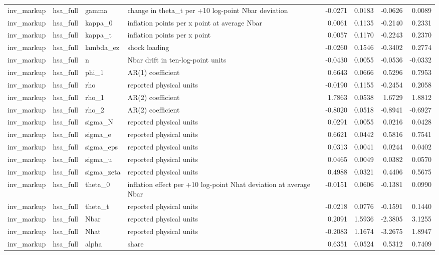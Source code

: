 \begin{tabular}{llllrrrr}
inv\_markup & hsa\_full & gamma & change in theta\_t per +10 log-point Nbar deviation & -0.0271 & 0.0183 & -0.0626 & 0.0089 \\
inv\_markup & hsa\_full & kappa\_0 & inflation points per x point at average Nbar & 0.0061 & 0.1135 & -0.2140 & 0.2331 \\
inv\_markup & hsa\_full & kappa\_t & inflation points per x point & 0.0057 & 0.1170 & -0.2243 & 0.2370 \\
inv\_markup & hsa\_full & lambda\_ez & shock loading & -0.0260 & 0.1546 & -0.3402 & 0.2774 \\
inv\_markup & hsa\_full & n & Nbar drift in ten-log-point units & -0.0430 & 0.0055 & -0.0536 & -0.0332 \\
inv\_markup & hsa\_full & phi\_1 & AR(1) coefficient & 0.6643 & 0.0666 & 0.5296 & 0.7953 \\
inv\_markup & hsa\_full & rho & reported physical units & -0.0190 & 0.1155 & -0.2454 & 0.2058 \\
inv\_markup & hsa\_full & rho\_1 & AR(2) coefficient & 1.7863 & 0.0538 & 1.6729 & 1.8812 \\
inv\_markup & hsa\_full & rho\_2 & AR(2) coefficient & -0.8020 & 0.0518 & -0.8941 & -0.6927 \\
inv\_markup & hsa\_full & sigma\_N & reported physical units & 0.0291 & 0.0055 & 0.0216 & 0.0428 \\
inv\_markup & hsa\_full & sigma\_e & reported physical units & 0.6621 & 0.0442 & 0.5816 & 0.7541 \\
inv\_markup & hsa\_full & sigma\_eps & reported physical units & 0.0313 & 0.0041 & 0.0244 & 0.0402 \\
inv\_markup & hsa\_full & sigma\_u & reported physical units & 0.0465 & 0.0049 & 0.0382 & 0.0570 \\
inv\_markup & hsa\_full & sigma\_zeta & reported physical units & 0.4988 & 0.0321 & 0.4406 & 0.5675 \\
inv\_markup & hsa\_full & theta\_0 & inflation effect per +10 log-point Nhat deviation at average Nbar & -0.0151 & 0.0606 & -0.1381 & 0.0990 \\
inv\_markup & hsa\_full & theta\_t & reported physical units & -0.0218 & 0.0776 & -0.1591 & 0.1440 \\
inv\_markup & hsa\_full & Nbar & reported physical units & 0.2091 & 1.5936 & -2.3805 & 3.1255 \\
inv\_markup & hsa\_full & Nhat & reported physical units & -0.2083 & 1.1674 & -3.2675 & 1.8947 \\
inv\_markup & hsa\_full & alpha & share & 0.6351 & 0.0524 & 0.5312 & 0.7409 \\

\end{tabular}
